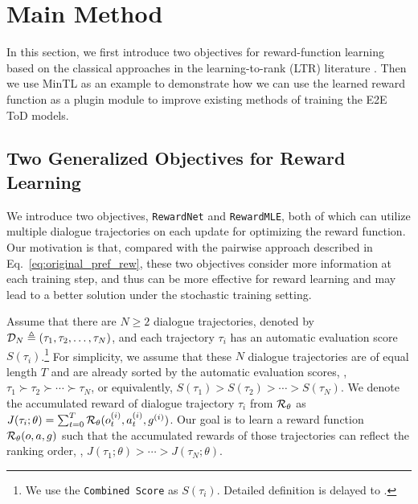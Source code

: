 \vspace{-.2em}
\section{Main Method}\label{sec:main_method}
\vspace{-.2em}
In this section, we first introduce two objectives for reward-function learning
based on the classical approaches in the learning-to-rank (LTR) literature \citep{liu2009learning}.
Then we use MinTL \citep{mintl2020} as an example to demonstrate how we can use the learned reward function as a plugin module to improve existing methods of training the E2E ToD models.

\vspace{-.4em}
\subsection{Two Generalized Objectives for Reward Learning}\label{sec:main_rew_obj}
\vspace{-.4em}
We introduce two objectives, \texttt{RewardNet} and \texttt{RewardMLE}, both of which can utilize multiple dialogue trajectories 
on each update for optimizing the reward function.
Our motivation is that, compared with the pairwise approach described in Eq.~\eqref{eq:original_pref_rew}, these two objectives consider more information at each training step, and thus can be more effective for reward learning and may lead to a better solution under the stochastic training setting.

Assume that there are $N \geq 2$ dialogue trajectories, denoted by ${\mathcal{D}}_{N} \triangleq (\tau_1, \tau_2, \ldots, \tau_N)$, 
and each trajectory $\tau_i$ has an automatic evaluation score $S(\tau_i)$.\footnote{We use the \texttt{Combined Score} \citep{sfnrl2019} as $S(\tau_i)$. Detailed definition is delayed to .}
For simplicity, we assume that these $N$ dialogue trajectories are of equal length $T$ and are already sorted by the automatic evaluation scores, \ie, $ \tau_1 \succ \tau_2 \succ \cdots \succ \tau_N$, or equivalently, $S(\tau_1) > S(\tau_2) > \cdots > S(\tau_N)$.
We denote the accumulated reward of dialogue trajectory $\tau_i$ from ${\mathcal{R}}_\theta$ as $J(\tau_i; \theta)= \sum_{t=0}^{T}{\mathcal{R}}_{\theta}(o_t^{(i)},a_t^{(i)}, g^{(i)})$.
Our goal is to learn a reward function ${\mathcal{R}}_{\theta}(o, a, g)$ such that the accumulated rewards of those trajectories can reflect the ranking order, \ie, 
$J(\tau_1; \theta) > \cdots > J(\tau_N; \theta)$. 


